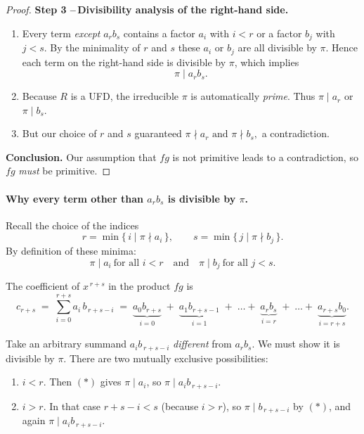 \documentclass[12pt]{article}
\theoremstyle{definition} %
\theoremstyle{plain} %
\begin{document}
\begin{proof}
  \medskip
  \noindent
  \textbf{Step 3 –\,Divisibility analysis of the right-hand side.}
  
  \begin{enumerate}[label=\textbf{(\arabic*)},start=6,itemsep=6pt]
  \item
  Every term \emph{except} $a_r b_s$ contains a factor $a_i$ with $i<r$ or
  a factor $b_j$ with $j<s$.
  By the minimality of $r$ and $s$ these $a_i$ or $b_j$ are all divisible
  by $\pi$.
  Hence each term on the right-hand side is divisible by $\pi$, which
  implies
  \[
    \pi \mid a_r b_s.
  \]
  
  \item
  Because $R$ is a UFD, the irreducible $\pi$ is automatically
  \emph{prime}.
  Thus $\pi\mid a_r$ or $\pi\mid b_s$.
  
  \item
  But our choice of $r$ and $s$ guaranteed
  \(
    \pi\nmid a_r \text{ and } \pi\nmid b_s,
  \)
  a contradiction.
  \end{enumerate}
  
  \medskip
  \noindent
  \textbf{Conclusion.}
  Our assumption that $fg$ is not primitive leads to a contradiction, so
  $fg$ \emph{must} be primitive.
  \end{proof}
  \paragraph{Why every term other than $a_r b_s$ is divisible by $\pi$.}

Recall the choice of the indices
\[
  r=\min\{\,i \mid \pi\nmid a_i\,\},
  \qquad
  s=\min\{\,j \mid \pi\nmid b_j\,\}.
\]
By definition of these minima:
\[
  \boxed{\;
    \pi\mid a_i \ \text{for all } i<r
    \quad\text{and}\quad
    \pi\mid b_j \ \text{for all } j<s.
  \;}
\tag{$\ast$}
\]

The coefficient of $x^{\,r+s}$ in the product $fg$
is
\[
  c_{r+s}
  \;=\;
  \sum_{i=0}^{r+s} a_i\,b_{\,r+s-i}
  \;=\;
  \underbrace{a_0 b_{r+s}}_{i=0}
  \;+\;
  \underbrace{a_1 b_{r+s-1}}_{i=1}
  \;+\;\dots+\;
  \underbrace{a_r b_s}_{i=r}
  \;+\;\dots+\;
  \underbrace{a_{r+s} b_0}_{i=r+s}.
\]

Take an arbitrary summand $a_i b_{\,r+s-i}$ \emph{different} from
$a_r b_s$.
We must show it is divisible by $\pi$.
There are two mutually exclusive possibilities:

\begin{enumerate}[label=\textbf{Case \arabic*:}, leftmargin=12pt]
\item $i<r$.  
      Then $(\ast)$ gives $\pi\mid a_i$, so
      $\pi\mid a_i b_{\,r+s-i}$.
\item $i>r$.  
      In that case $r+s-i < s$ (because $i>r$), so
      $\pi\mid b_{\,r+s-i}$ by $(\ast)$, and again
      $\pi\mid a_i b_{\,r+s-i}$.
\end{enumerate}
\end{document}
